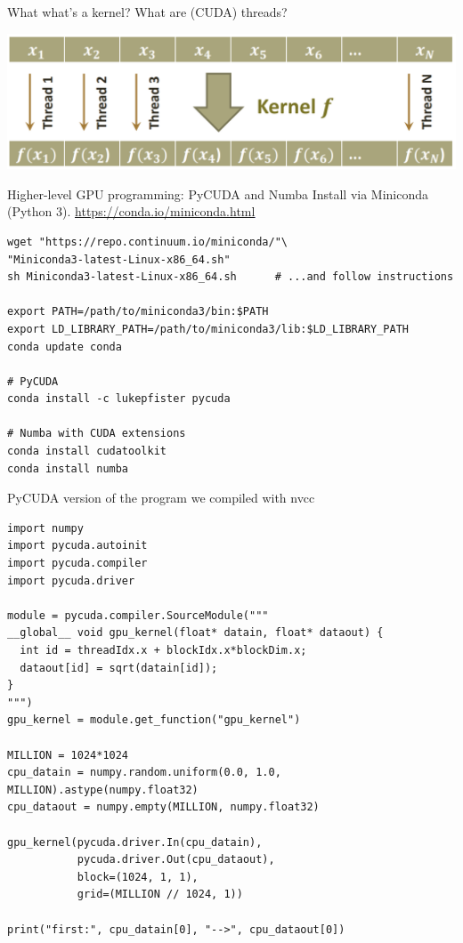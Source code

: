 \documentclass[aspectratio=169]{beamer}
\begin{document}
\begin{frame}{What what's a kernel? What are (CUDA) threads?}
\vspace{0.5 cm}

\begin{center}
\includegraphics[width=0.85\linewidth]{threads.png}
\end{center}
\end{frame}

\begin{frame}[fragile]{Higher-level GPU programming: PyCUDA and Numba}
\vspace{0.25 cm}
\Large Install via Miniconda (Python 3). \textcolor{blue}{\normalsize\underline{\url{https://conda.io/miniconda.html}}}

\small
\begin{verbatim}
wget "https://repo.continuum.io/miniconda/"\
"Miniconda3-latest-Linux-x86_64.sh"
sh Miniconda3-latest-Linux-x86_64.sh      # ...and follow instructions

export PATH=/path/to/miniconda3/bin:$PATH
export LD_LIBRARY_PATH=/path/to/miniconda3/lib:$LD_LIBRARY_PATH
conda update conda

# PyCUDA
conda install -c lukepfister pycuda

# Numba with CUDA extensions
conda install cudatoolkit
conda install numba
\end{verbatim}
\end{frame}

\begin{frame}[fragile]{PyCUDA version of the program we compiled with nvcc}
\vspace{0.1 cm}
\scriptsize
\begin{verbatim}
import numpy
import pycuda.autoinit
import pycuda.compiler
import pycuda.driver

module = pycuda.compiler.SourceModule("""
__global__ void gpu_kernel(float* datain, float* dataout) {
  int id = threadIdx.x + blockIdx.x*blockDim.x;
  dataout[id] = sqrt(datain[id]);
}
""")
gpu_kernel = module.get_function("gpu_kernel")

MILLION = 1024*1024
cpu_datain = numpy.random.uniform(0.0, 1.0, MILLION).astype(numpy.float32)
cpu_dataout = numpy.empty(MILLION, numpy.float32)

gpu_kernel(pycuda.driver.In(cpu_datain),
           pycuda.driver.Out(cpu_dataout),
           block=(1024, 1, 1),
           grid=(MILLION // 1024, 1))

print("first:", cpu_datain[0], "-->", cpu_dataout[0])
\end{verbatim}
\end{frame}
\end{document}
